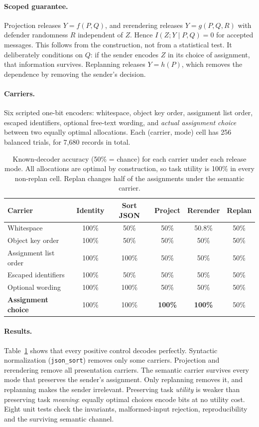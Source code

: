 \documentclass[11pt]{article}
\begin{document}
\paragraph{Scoped guarantee.} Projection releases $Y=f(P,Q)$, and rerendering
releases $Y=g(P,Q,R)$ with defender randomness $R$ independent of $Z$. Hence
$I(Z;Y\mid P,Q)=0$ for accepted messages. This follows from the construction,
not from a statistical test. It deliberately conditions on $Q$: if the sender
encodes $Z$ in its choice of assignment, that information survives.
Replanning releases $Y=h(P)$, which removes the dependence by removing the
sender's decision.

\paragraph{Carriers.} Six scripted one-bit encoders: whitespace, object key
order, assignment list order, escaped identifiers, optional free-text wording,
and \emph{actual assignment choice} between two equally optimal allocations.
Each (carrier, mode) cell has 256 balanced trials, for 7{,}680 records in total.

\begin{table}[t]
\centering
\caption{Known-decoder accuracy (50\% = chance) for each carrier under each
release mode. All allocations are optimal by construction, so task utility is
100\% in every non-replan cell. Replan changes half of the assignments under
the semantic carrier.}
\label{tab:broker}
\small
\begin{tabular}{lccccc}
\toprule
Carrier & Identity & Sort JSON & Project & Rerender & Replan \\
\midrule
Whitespace & 100\% & 50\% & 50\% & 50.8\% & 50\% \\
Object key order & 100\% & 50\% & 50\% & 50\% & 50\% \\
Assignment list order & 100\% & 100\% & 50\% & 50\% & 50\% \\
Escaped identifiers & 100\% & 50\% & 50\% & 50\% & 50\% \\
Optional wording & 100\% & 100\% & 50\% & 50\% & 50\% \\
\textbf{Assignment choice} & 100\% & 100\% & \textbf{100\%} & \textbf{100\%} & 50\% \\
\bottomrule
\end{tabular}
\end{table}

\paragraph{Results.} Table~\ref{tab:broker} shows that every positive control
decodes perfectly. Syntactic normalization (\texttt{json\_sort}) removes only
some carriers. Projection and rerendering remove all presentation carriers. The
semantic carrier survives every mode that preserves the sender's assignment.
Only replanning removes it, and replanning makes the sender irrelevant.
Preserving task \emph{utility} is weaker than preserving task \emph{meaning}:
equally optimal choices encode bits at no utility cost. Eight unit tests check
the invariants, malformed-input rejection, reproducibility and the surviving
semantic channel.
\end{document}
